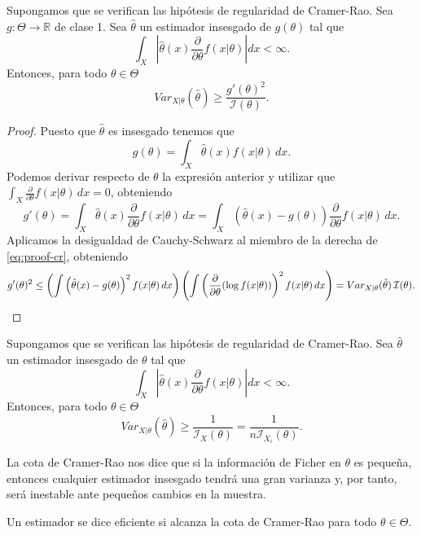 \documentclass{article}
\begin{document}
    \begin{thm}
        Supongamos que se verifican las hipótesis de regularidad de Cramer-Rao. Sea $g: \Theta \to  \mathbb{R}$ de clase 1. Sea $\hat{\theta}$ un estimador insesgado de $g(\theta)$ tal que
        \[\int_X \left|\hat{\theta}(x) \frac{\partial}{\partial \theta}f(x | \theta)\right| dx < \infty.\]
        Entonces, para todo $\theta \in \Theta$
        \[Var_{X|\theta}(\hat{\theta}) \ge \frac{g'(\theta)^2}{\mathcal{I}(\theta)}.\]
    \end{thm}
    \begin{proof}
        Puesto que $\hat{\theta}$ es insesgado tenemos que
        \[g(\theta) = \int_X \hat{\theta}(x) f(x|\theta)\,dx.\]
        Podemos derivar respecto de $\theta$ la expresión anterior y utilizar que $\int_X \frac{\partial}{\partial \theta}f(x|\theta) \, dx = 0$, obteniendo
        \begin{equation}\label{eq:proof-cr}
        g'(\theta) = \int_X \hat{\theta}(x)\frac{\partial}{\partial \theta}f(x|\theta)\,dx = \int_X \left(\hat{\theta}(x) - g(\theta)\right)\frac{\partial}{\partial \theta}f(x|\theta)\,dx.
        \end{equation}
        Aplicamos la desigualdad de Cauchy-Schwarz al miembro de la derecha de \eqref{eq:proof-cr}, obteniendo
        \[g'(\theta)^2  \le \left( \int \left(\hat\theta(x) - g(\theta)\right)^2 f(x|\theta) \, dx \right) \left(\int \left( \frac{\partial}{\partial\theta} (\log f(x|\theta)) \right)^2 f(x|\theta) \, dx \right) = Var_{X|\theta}(\hat\theta) \, \mathcal{I}(\theta). \qedhere\]
    \end{proof}

    \begin{cor}
        Supongamos que se verifican las hipótesis de regularidad de Cramer-Rao. Sea $\hat{\theta}$ un estimador insesgado de $\theta$ tal que
        \[\int_X \left|\hat{\theta}(x) \frac{\partial}{\partial \theta} f(x | \theta)\right| dx < \infty.\]
        Entonces, para todo $\theta \in \Theta$
        \[Var_{X|\theta}(\hat{\theta}) \ge \frac{1}{\mathcal{I}_X(\theta)} = \frac{1}{n\mathcal{I}_{X_i}(\theta)}.\]
    \end{cor}

    La cota de Cramer-Rao nos dice que si la información de Ficher en $\theta$ es pequeña, entonces cualquier estimador insesgado tendrá una gran varianza y, por tanto, será inestable ante pequeños cambios en la muestra.

    \begin{definition}
        Un estimador se dice eficiente si alcanza la cota de Cramer-Rao para todo $\theta \in \Theta$.
    \end{definition}
\end{document}
